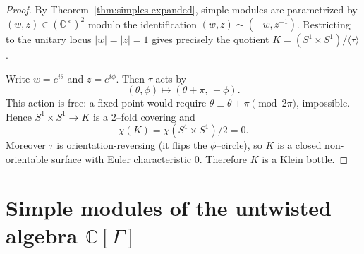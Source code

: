 \documentclass[11pt]{amsart}
\theoremstyle{remark}
\theoremstyle{definition}
\newcommand{\C}{\mathbb{C}}
\begin{document}
\begin{proof}
By Theorem~\ref{thm:simples-expanded}, simple modules are parametrized by
$(w,z)\in(\C^\times)^2$ modulo the identification $(w,z)\sim(-w,z^{-1})$.
Restricting to the unitary locus $|w|=|z|=1$ gives precisely the quotient
$K=(S^1\times S^1)/\langle\tau\rangle$.

Write $w=e^{i\theta}$ and $z=e^{i\phi}$. Then $\tau$ acts by
\[
(\theta,\phi)\longmapsto(\theta+\pi,\,-\phi).
\]
This action is free: a fixed point would require $\theta\equiv \theta+\pi \pmod{2\pi}$,
impossible. Hence $S^1\times S^1\to K$ is a $2$--fold covering and
\[
\chi(K)=\chi(S^1\times S^1)/2 = 0.
\]
Moreover $\tau$ is orientation-reversing (it flips the $\phi$--circle), so $K$ is a closed
non-orientable surface with Euler characteristic $0$. Therefore $K$ is a Klein bottle.
\end{proof}





\section{Simple modules of the untwisted algebra $\C[\Gamma]$}
\end{document}
